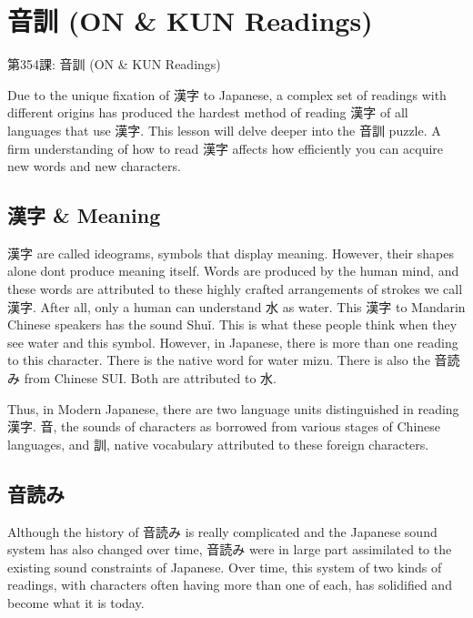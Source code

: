    
\chapter{音訓 (ON \& KUN Readings)}

\begin{center}
\begin{Large}
第354課: 音訓 (ON \& KUN Readings) 
\end{Large}
\end{center}
 
\par{ Due to the unique fixation of 漢字 to Japanese, a complex set of readings with different origins has produced the hardest method of reading 漢字 of all languages that use 漢字. This lesson will delve deeper into the 音訓 puzzle. A firm understanding of how to read 漢字 affects how efficiently you can acquire new words and new characters. }
      
\section{漢字 \& Meaning}
 
\par{ 漢字 are called ideograms, symbols that display meaning. However, their shapes alone don\textquotesingle t produce meaning itself. Words are produced by the human mind, and these words are attributed to these highly crafted arrangements of strokes we call 漢字. After all, only a human can understand 水 as water. This 漢字 to Mandarin Chinese speakers has the sound Shuǐ. This is what these people think when they see water and this symbol. However, in Japanese, there is more than one reading to this character. There is the native word for water mizu. There is also the 音読み from Chinese SUI. Both are attributed to 水. }

\par{ Thus, in Modern Japanese, there are two language units distinguished in reading 漢字. 音, the sounds of characters as borrowed from various stages of Chinese languages, and 訓, native vocabulary attributed to these foreign characters. }
      
\section{音読み}
 
\par{ Although the history of 音読み is really complicated and the Japanese sound system has also changed over time, 音読み were in large part assimilated to the existing sound constraints of Japanese. Over time, this system of two kinds of readings, with characters often having more than one of each, has solidified and become what it is today. }

